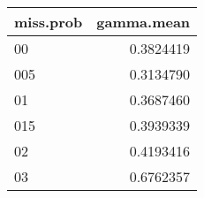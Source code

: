 \captionsetup[table]{labelformat=empty,skip=1pt}
\begin{longtable}{lr}
\toprule
miss.prob & gamma.mean \\ 
\midrule
00 & 0.3824419 \\ 
005 & 0.3134790 \\ 
01 & 0.3687460 \\ 
015 & 0.3939339 \\ 
02 & 0.4193416 \\ 
03 & 0.6762357 \\ 
 \bottomrule
\end{longtable}

